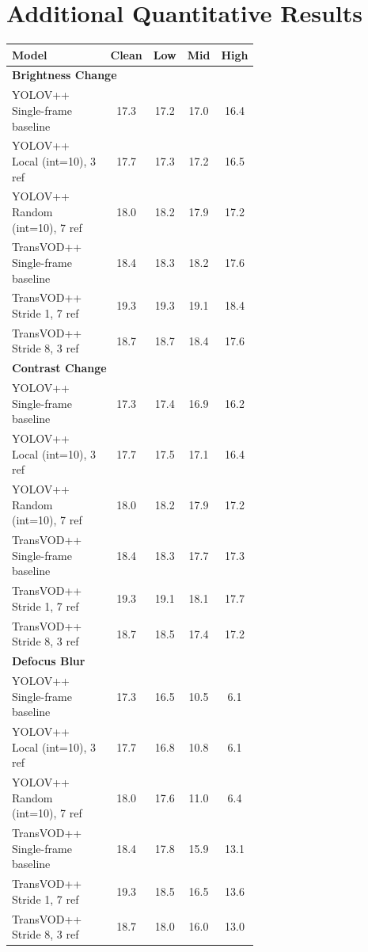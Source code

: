 \documentclass[final,twoside]{vutinfth}
\begin{document}

\chapter{Additional Quantitative Results}
\label{chap:additional_results}

\begin{table}[t]
\centering
\small
\begin{tabular}{p{0.62\linewidth}cccc}
\toprule
Model & Clean & Low & Mid & High \\
\midrule

\multicolumn{5}{l}{\textbf{Brightness Change}} \\
YOLOV++ Single-frame baseline & 17.3 & 17.2 & 17.0 & 16.4 \\
YOLOV++ Local (int=10), 3 ref & 17.7 & 17.3 & 17.2 & 16.5 \\
YOLOV++ Random (int=10), 7 ref & 18.0 & 18.2 & 17.9 & 17.2 \\
TransVOD++ Single-frame baseline & 18.4 & 18.3 & 18.2 & 17.6 \\
TransVOD++ Stride 1, 7 ref & 19.3 & 19.3 & 19.1 & 18.4 \\
TransVOD++ Stride 8, 3 ref & 18.7 & 18.7 & 18.4 & 17.6 \\
\midrule

\multicolumn{5}{l}{\textbf{Contrast Change}} \\
YOLOV++ Single-frame baseline & 17.3 & 17.4 & 16.9 & 16.2 \\
YOLOV++ Local (int=10), 3 ref & 17.7 & 17.5 & 17.1 & 16.4 \\
YOLOV++ Random (int=10), 7 ref & 18.0 & 18.2 & 17.9 & 17.2 \\
TransVOD++ Single-frame baseline & 18.4 & 18.3 & 17.7 & 17.3\\
TransVOD++ Stride 1, 7 ref & 19.3 & 19.1 & 18.1 & 17.7 \\
TransVOD++ Stride 8, 3 ref & 18.7 & 18.5 & 17.4 & 17.2 \\
\midrule

\multicolumn{5}{l}{\textbf{Defocus Blur}} \\
YOLOV++ Single-frame baseline & 17.3 & 16.5 & 10.5 & 6.1 \\
YOLOV++ Local (int=10), 3 ref & 17.7 & 16.8 & 10.8 & 6.1 \\
YOLOV++ Random (int=10), 7 ref & 18.0 & 17.6 & 11.0 & 6.4 \\
TransVOD++ Single-frame baseline & 18.4 & 17.8 & 15.9 & 13.1 \\
TransVOD++ Stride 1, 7 ref & 19.3 & 18.5 & 16.5 & 13.6 \\
TransVOD++ Stride 8, 3 ref & 18.7 & 18.0 & 16.0 & 13.0 \\
\midrule


\end{tabular}
\end{table}
\end{document}
